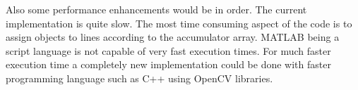 \documentclass{article}
\begin{document}
      Also some performance enhancements would be in order. The current implementation is quite slow. The most time consuming aspect of the code is to assign objects to lines according to the accumulator array. MATLAB being a script language is not capable of very fast execution times. For much faster execution time a completely new implementation could be done with faster programming language such as C++ using OpenCV \cite{OpenCV} libraries.

  \newpage
  
  
\end{document}
